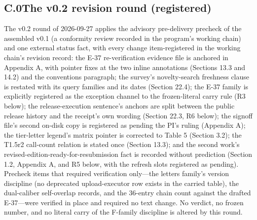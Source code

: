 \documentclass[11pt]{article}
\begin{document}
\subsection*{C.0\quad The v0.2 revision round (registered)}
\noindent The v0.2 round of 2026-09-27 applies the advisory pre-delivery precheck of the assembled v0.1 (a conformity review recorded in the program's working chain) and one external status fact, with every change item-registered in the working chain's revision record: the E-37 re-verification evidence file is anchored in Appendix A, with pointer fixes at the two inline annotations (Sections 13.3 and 14.2) and the conventions paragraph; the survey's novelty-search freshness clause is restated with its query families and its dates (Section 22.4); the E-37 family is explicitly registered as the exception channel to the frozen-literal carry rule (R3 below); the release-execution sentence's anchors are split between the public release history and the receipt's own wording (Section 22.3, R6 below); the signoff file's second on-disk copy is registered as pending the PI's ruling (Appendix A); the tier-letter legend's matrix pointer is corrected to Table 5 (Section 3.2); the T1.5r2 call-count relation is stated once (Section 13.3); and the second work's revised-edition-ready-for-resubmission fact is recorded without prediction (Section 1.2, Appendix A, and R5 below, with the refresh slots registered as pending). Precheck items that required verification only—the letters family's version discipline (no deprecated upload-executor row exists in the carried table), the dual-caliber self-overlap records, and the 36-entry chain count against the drafted E-37—were verified in place and required no text change. No verdict, no frozen number, and no literal carry of the F-family discipline is altered by this round.\par
\end{document}
